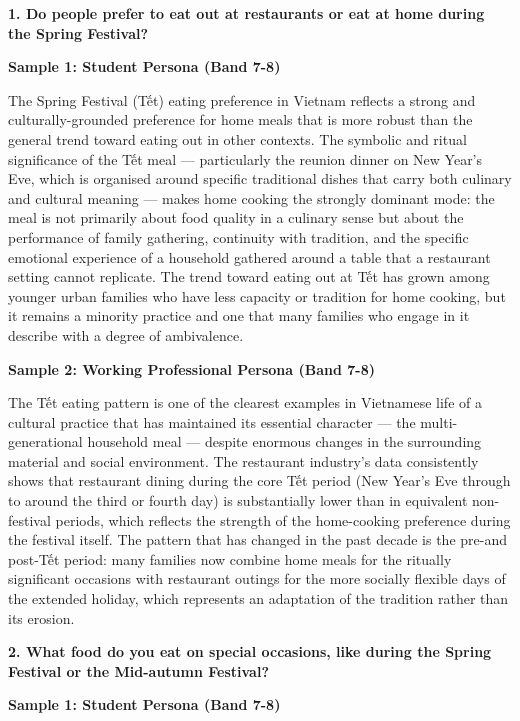 \partthreeheader

\begin{ieltsquestion}
\textbf{1. Do people prefer to eat out at restaurants or eat at home during the Spring Festival?}
\end{ieltsquestion}
\textbf{Sample 1: Student Persona (Band 7-8)}

The Spring Festival (Tết) eating preference in Vietnam reflects a strong and culturally-grounded preference for home meals that is more robust than the general trend toward eating out in other contexts. The symbolic and ritual significance of the Tết meal — particularly the reunion dinner on New Year's Eve, which is organised around specific traditional dishes that carry both culinary and cultural meaning — makes home cooking the strongly dominant mode: the meal is not primarily about food quality in a culinary sense but about the performance of family gathering, continuity with tradition, and the specific emotional experience of a household gathered around a table that a restaurant setting cannot replicate. The trend toward eating out at Tết has grown among younger urban families who have less capacity or tradition for home cooking, but it remains a minority practice and one that many families who engage in it describe with a degree of ambivalence.

\textbf{Sample 2: Working Professional Persona (Band 7-8)}

The Tết eating pattern is one of the clearest examples in Vietnamese life of a cultural practice that has maintained its essential character — the multi-generational household meal — despite enormous changes in the surrounding material and social environment. The restaurant industry's data consistently shows that restaurant dining during the core Tết period (New Year's Eve through to around the third or fourth day) is substantially lower than in equivalent non-festival periods, which reflects the strength of the home-cooking preference during the festival itself. The pattern that has changed in the past decade is the pre-and post-Tết period: many families now combine home meals for the ritually significant occasions with restaurant outings for the more socially flexible days of the extended holiday, which represents an adaptation of the tradition rather than its erosion.

\separator

\begin{ieltsquestion}
\textbf{2. What food do you eat on special occasions, like during the Spring Festival or the Mid-autumn Festival?}
\end{ieltsquestion}
\textbf{Sample 1: Student Persona (Band 7-8)}

